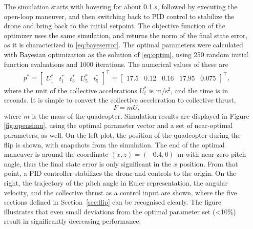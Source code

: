 The simulation starts with hovering for about 0.1 s, followed by executing the open-loop maneuver, and then switching back to PID control to stabilize the drone and bring back to the initial setpoint. The objective function of the optimizer uses the same simulation, and returns the norm of the final state error, as it is characterized in \eqref{eq:bayeserror}. The optimal parameters were calculated with Bayesian optimization as the solution of \eqref{eq:optim}, using 250 random initial function evaluations and 1000 iterations. The numerical values of these are
\begin{align}\label{eq:optparam}
p^*=\begin{bmatrix}
U_1^* & t_1^* & t_3^* & U_5^*& t_5^*
\end{bmatrix} ^\top =  \begin{bmatrix}
17.5 & 0.12 & 0.16 & 17.95 & 0.075
\end{bmatrix}^\top,
\end{align}
where the unit of the collective accelerations $U_i^*$ is m/s$^2$, and the time is in seconds. It is simple to convert the collective acceleration to collective thrust, 
\begin{equation}
    F = m U,
\end{equation}
where $m$ is the mass of the quadcopter. Simulation results are displayed in Figure \ref{fig:opensimu}, using the optimal parameter vector and a set of near-optimal parameters, as well. On the left plot, the position of the quadcopter during the flip is shown, with snapshots from the simulation. The end of the optimal maneuver is around the coordinate $(x, z)=(-0.4, 0)$~m with near-zero pitch angle, thus the final state error is only significant in the $x$ position. From that point, a PID controller\cite{gym} stabilizes the drone and controls to the origin. On the right, the trajectory of the pitch angle in Euler representation, the angular velocity, and the collective thrust as a control input are shown, where the five sections defined in Section~\ref{sec:flip} can be recognised clearly. The figure illustrates that even small deviations from the optimal parameter set (<10\%) result in significantly decreasing performance.

